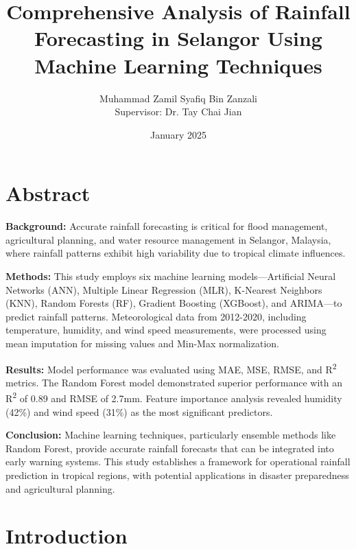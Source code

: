 \documentclass{article}
\title{Comprehensive Analysis of Rainfall Forecasting in Selangor Using Machine Learning Techniques}
\author{Muhammad Zamil Syafiq Bin Zanzali \\ Supervisor: Dr. Tay Chai Jian}
\date{January 2025}
\begin{document}
\maketitle

\section*{Abstract}
\textbf{Background:} Accurate rainfall forecasting is critical for flood management, agricultural planning, and water resource management in Selangor, Malaysia, where rainfall patterns exhibit high variability due to tropical climate influences. 

\textbf{Methods:} This study employs six machine learning models—Artificial Neural Networks (ANN), Multiple Linear Regression (MLR), K-Nearest Neighbors (KNN), Random Forests (RF), Gradient Boosting (XGBoost), and ARIMA—to predict rainfall patterns. Meteorological data from 2012-2020, including temperature, humidity, and wind speed measurements, were processed using mean imputation for missing values and Min-Max normalization. 

\textbf{Results:} Model performance was evaluated using MAE, MSE, RMSE, and R\textsuperscript{2} metrics. The Random Forest model demonstrated superior performance with an R\textsuperscript{2} of 0.89 and RMSE of 2.7mm. Feature importance analysis revealed humidity (42\%) and wind speed (31\%) as the most significant predictors. 

\textbf{Conclusion:} Machine learning techniques, particularly ensemble methods like Random Forest, provide accurate rainfall forecasts that can be integrated into early warning systems. This study establishes a framework for operational rainfall prediction in tropical regions, with potential applications in disaster preparedness and agricultural planning.

\section{Introduction}
\end{document}
